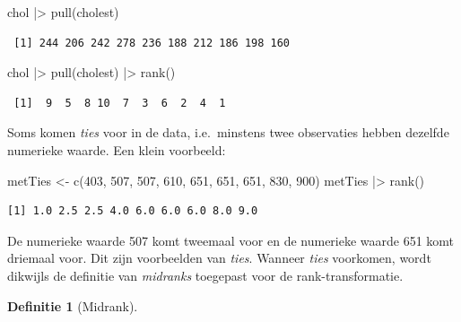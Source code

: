 \documentclass[
  dutch,
  letterpaper,
  12pt]{book}
\newenvironment{Shaded}{\begin{snugshade}}{\end{snugshade}}
\newcommand{\DecValTok}[1]{\textcolor[rgb]{0.68,0.00,0.00}{#1}}
\newcommand{\FunctionTok}[1]{\textcolor[rgb]{0.28,0.35,0.67}{#1}}
\newcommand{\NormalTok}[1]{\textcolor[rgb]{0.00,0.23,0.31}{#1}}
\newcommand{\OtherTok}[1]{\textcolor[rgb]{0.00,0.23,0.31}{#1}}
\newcommand{\SpecialCharTok}[1]{\textcolor[rgb]{0.37,0.37,0.37}{#1}}
\theoremstyle{definition}
\theoremstyle{definition}
\newtheorem{definition}{Definitie}[chapter]
\theoremstyle{definition}
\theoremstyle{remark}
\begin{document}
\begin{Shaded}
\begin{Highlighting}[]
\NormalTok{chol }\SpecialCharTok{|\textgreater{}}
  \FunctionTok{pull}\NormalTok{(cholest)}
\end{Highlighting}
\end{Shaded}

\begin{verbatim}
 [1] 244 206 242 278 236 188 212 186 198 160
\end{verbatim}

\begin{Shaded}
\begin{Highlighting}[]
\NormalTok{chol }\SpecialCharTok{|\textgreater{}}
  \FunctionTok{pull}\NormalTok{(cholest) }\SpecialCharTok{|\textgreater{}}
  \FunctionTok{rank}\NormalTok{()}
\end{Highlighting}
\end{Shaded}

\begin{verbatim}
 [1]  9  5  8 10  7  3  6  2  4  1
\end{verbatim}

Soms komen \emph{ties} voor in de data, i.e.~minstens twee observaties
hebben dezelfde numerieke waarde. Een klein voorbeeld:

\begin{Shaded}
\begin{Highlighting}[]
\NormalTok{metTies }\OtherTok{\textless{}{-}} \FunctionTok{c}\NormalTok{(}\DecValTok{403}\NormalTok{, }\DecValTok{507}\NormalTok{, }\DecValTok{507}\NormalTok{, }\DecValTok{610}\NormalTok{, }\DecValTok{651}\NormalTok{, }\DecValTok{651}\NormalTok{, }\DecValTok{651}\NormalTok{, }\DecValTok{830}\NormalTok{, }\DecValTok{900}\NormalTok{)}
\NormalTok{metTies }\SpecialCharTok{|\textgreater{}} \FunctionTok{rank}\NormalTok{()}
\end{Highlighting}
\end{Shaded}

\begin{verbatim}
[1] 1.0 2.5 2.5 4.0 6.0 6.0 6.0 8.0 9.0
\end{verbatim}

De numerieke waarde 507 komt tweemaal voor en de numerieke waarde 651
komt driemaal voor. Dit zijn voorbeelden van \emph{ties}. Wanneer
\emph{ties} voorkomen, wordt dikwijls de definitie van \emph{midranks}
toegepast voor de rank-transformatie.

\begin{definition}[Midrank]\protect\hypertarget{def-midrank}{}\label{def-midrank}

~

\end{definition}
\end{document}
